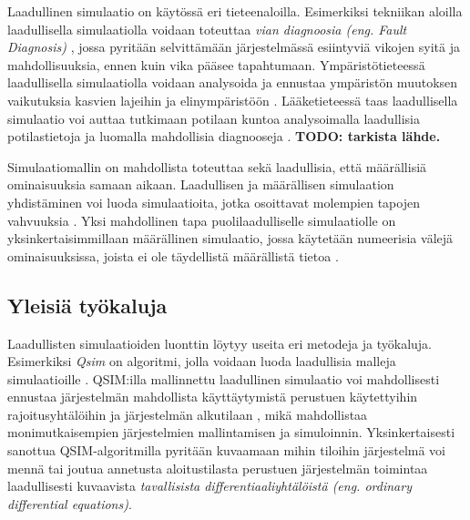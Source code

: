 \documentclass[utf8]{gradu3}
\begin{document}
Laadullinen simulaatio on käytössä eri tieteenaloilla.
Esimerkiksi tekniikan aloilla laadullisella simulaatiolla voidaan toteuttaa
\textit{vian diagnoosia (eng. Fault Diagnosis)} \parencite{QualitativeReasoning1997},
jossa pyritään selvittämään järjestelmässä esiintyviä vikojen syitä ja mahdollisuuksia, 
ennen kuin vika pääsee tapahtumaan.
Ympäristötieteessä laadullisella simulaatiolla voidaan analysoida ja ennustaa
ympäristön muutoksen vaikutuksia kasvien lajeihin ja elinympäristöön \parencite{qualiAnalysisEnviron2010}.
Lääketieteessä taas laadullisella simulaatio voi auttaa tutkimaan potilaan kuntoa analysoimalla laadullisia potilastietoja ja luomalla mahdollisia diagnooseja \parencite{QualitativeReasoning1997}. \textbf{TODO: tarkista lähde.}

Simulaatiomallin on mahdollista toteuttaa sekä laadullisia, 
että määrällisiä ominaisuuksia samaan aikaan. 
Laadullisen ja määrällisen simulaation yhdistäminen voi luoda simulaatioita, 
jotka osoittavat molempien tapojen vahvuuksia 
\parencite{semiHybrid1997qualitative}. 
Yksi mahdollinen tapa puolilaadulliselle simulaatiolle on yksinkertaisimmillaan
määrällinen simulaatio, jossa käytetään numeerisia välejä ominaisuuksissa, 
joista ei ole täydellistä määrällistä tietoa \parencite{semiHybrid1997qualitative}.

\subsection{Yleisiä työkaluja}
\begin{comment}
Käytännössä kai loppupelissä tietokone ajaa konkreettista määrällisät mallia konkreettisilla parametreilla. Mitä työkaluja tämän tason päällä on, jotta käyttäjälle syntyy näkymä laadullisemmasta lähestymistavasta. 
Esim jos syöte on intervalleja tarkkojen arvojen sijaan, ohjelmisto haarukoi lopputuloksen ääriarvot kaikilla parametrikombinaatioilla tai antaa erilaisen tavan kuvata riippuvuuksia (smeat kuvaukset).
\end{comment}
Laadullisten simulaatioiden luonttin löytyy useita eri metodeja ja työkaluja.
Esimerkiksi \textit{Qsim} on algoritmi, jolla voidaan luoda laadullisia malleja simulaatioille
\parencite{kuipers1986qualitative}. 
QSIM:illa mallinnettu laadullinen simulaatio voi mahdollisesti ennustaa 
järjestelmän mahdollista käyttäytymistä perustuen käytettyihin rajoitusyhtälöihin 
ja järjestelmän alkutilaan \parencite{kuipers1986qualitative}, mikä mahdollistaa
monimutkaisempien järjestelmien mallintamisen ja simuloinnin.
Yksinkertaisesti sanottua QSIM-algoritmilla pyritään kuvaamaan mihin tiloihin
järjestelmä voi mennä tai joutua annetusta aloitustilasta 
perustuen järjestelmän toimintaa laadullisesti kuvaavista 
\textit{ tavallisista differentiaaliyhtälöistä 
(eng. ordinary differential equations)}.
\end{document}
